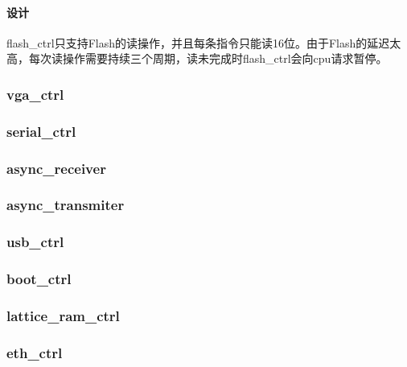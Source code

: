 \documentclass{article}
\begin{document}
\begin{spacing}{1.4}
\paragraph{设计}\mbox{}

flash\_ctrl只支持Flash的读操作，并且每条指令只能读16位。由于Flash的延迟太高，每次读操作需要持续三个周期，读未完成时flash\_ctrl会向cpu请求暂停。

\subsubsection{vga\_ctrl}
\subsubsection{serial\_ctrl}
\subsubsection{async\_receiver}
\subsubsection{async\_transmiter}
\subsubsection{usb\_ctrl}
\subsubsection{boot\_ctrl}
\subsubsection{lattice\_ram\_ctrl}
\subsubsection{eth\_ctrl}


\end{spacing}
\end{document}
